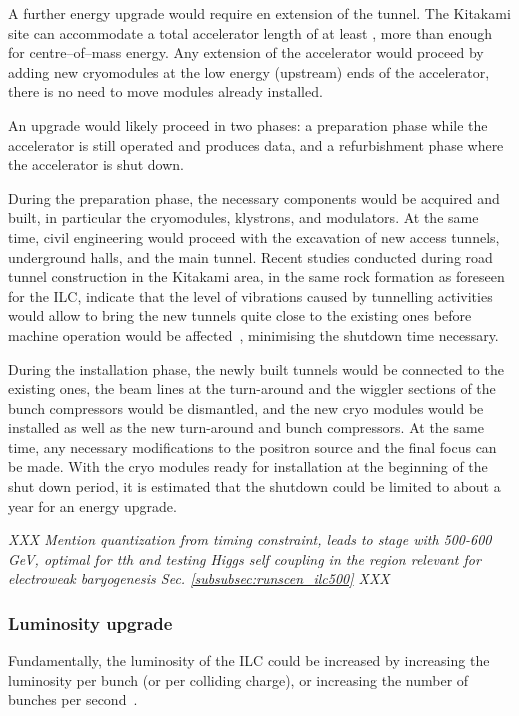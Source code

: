 A further energy upgrade would require en extension of the tunnel.
The Kitakami site can accommodate a total accelerator length of at least , more than enough for  centre--of--mass energy.
Any extension of the accelerator would proceed by adding new cryomodules at the low energy (upstream) ends of the accelerator, there is no need to move modules already installed. 

An upgrade would likely proceed in two phases: a preparation phase while the accelerator is still operated and produces data, and a refurbishment phase where the accelerator is shut down.

During the preparation phase, the necessary components would be acquired and built, in particular the cryomodules, klystrons, and modulators. 
At the same time, civil engineering would proceed with the excavation of new access tunnels, underground halls, and the main tunnel.
Recent studies conducted during road tunnel construction in the Kitakami area, in the same rock formation as foreseen for the ILC, indicate that the level of vibrations caused by tunnelling activities would allow to bring the new tunnels quite close to the existing ones before machine operation would be affected~\cite{bib:sanuki:lcws2018}, minimising the shutdown time necessary.

During the installation phase, the newly built tunnels would be connected to the existing ones, the beam lines at the turn-around and the wiggler sections of the bunch compressors would be dismantled, and the new cryo modules would be installed as well as the new turn-around and bunch compressors. 
At the same time, any necessary modifications to the positron source and the final focus can be made.
With the cryo modules ready for installation at the beginning of the shut down period, it is estimated that the shutdown could be limited to about a year for an energy upgrade.

{\it XXX Mention quantization from timing constraint, leads to stage with 500-600 GeV, optimal for tth and testing Higgs self coupling in the region relevant for electroweak baryogenesis Sec. \ref{subsubsec:runscen_ilc500} XXX }

\subsubsection{Luminosity upgrade}
\label{subsubsec:upg-optL}

Fundamentally, the luminosity of the ILC could be increased by increasing the luminosity per bunch (or per colliding charge), or increasing the number of bunches per second~\cite{Harrison:2013nva}.


